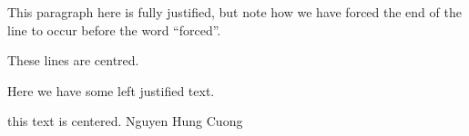 \documentclass{article}
\begin{document}
This paragraph here is fully justified, but note how we have \linebreak forced the end of the line to occur before the word ``forced''.

\begin{center}
    These lines \linebreak are centred.
\end{center}

\raggedright {Here we have some \linebreak left justified \linebreak text.}


\centerline{this text is centered. Nguyen Hung Cuong}
\end{document}
